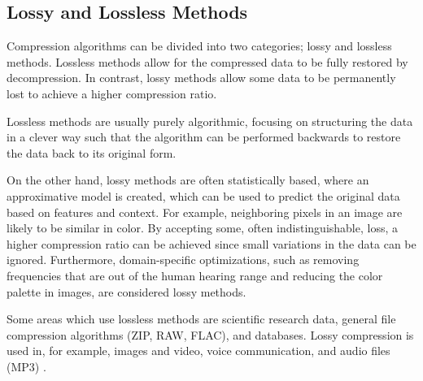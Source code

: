 \subsection{Lossy and Lossless Methods}
Compression algorithms can be divided into two categories; lossy and lossless methods. Lossless methods allow for the compressed data to be fully restored by decompression. In contrast, lossy methods allow some data to be permanently lost to achieve a higher compression ratio. 

Lossless methods are usually purely algorithmic, focusing on structuring the data in a clever way such that the algorithm can be performed backwards to restore the data back to its original form.

On the other hand, lossy methods are often statistically based, where an approximative model is created, which can be used to predict the original data based on features and context. For example, neighboring pixels in an image are likely to be similar in color. By accepting some, often indistinguishable, loss, a higher compression ratio can be achieved since small variations in the data can be ignored. Furthermore, domain-specific optimizations, such as removing frequencies that are out of the human hearing range and reducing the color palette in images, are considered lossy methods. 

Some areas which use lossless methods are scientific research data, general file compression algorithms (ZIP, RAW, FLAC), and databases. Lossy compression is used in, for example, 
images and video, voice communication, and audio files (MP3) \cite{lossyAndLossless}.


